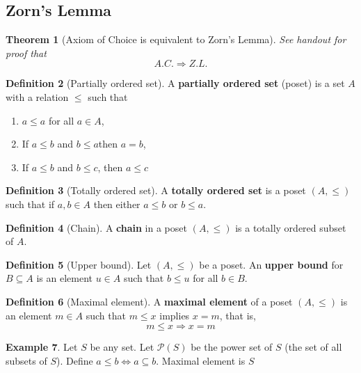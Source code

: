 \documentclass[10pt, oneside, reqno]{amsart}
\theoremstyle{plain}%
\newtheorem{thm}{Theorem}[section]
\theoremstyle{definition}
\newtheorem{defn}[thm]{Definition}
\newtheorem{exmp}[thm]{Example}
\theoremstyle{remark}
\begin{document}

\subsection{Zorn's Lemma} %
\label{sub:zorn_s_lemma}

\begin{thm}[Axiom of Choice is equivalent to Zorn's Lemma]
    See handout for proof that \[
        A.C. \Rightarrow Z.L.
    \]
\end{thm}

\begin{defn}[Partially ordered set]
    A \textbf{partially ordered set} (poset) is a set $A$ with a relation $\leq$ such that 
    \begin{enumerate}[(1)]
        \item $ a \leq a$ for all $a \in A$,
        \item If $a \leq b$ and $b \leq a$then $a = b$,
        \item If $a \leq b$ and $b \leq c$, then $a \leq c$
    \end{enumerate}
\end{defn}

\begin{defn}[Totally ordered set]
    A \textbf{totally ordered set} is a poset $(A, \leq)$ such that if $a, b \in A$ then either $a \leq b$ or $b \leq a$.
\end{defn}

\begin{defn}[Chain]
    A \textbf{chain} in a poset $(A, \leq)$ is a totally ordered subset of $A$.
\end{defn}

\begin{defn}[Upper bound]
    Let $(A, \leq)$ be a poset.  An \textbf{upper bound} for $B \subseteq A$ is an element $u \in A$ such that $b \leq u$ for all $ b \in B$.  
\end{defn}

\begin{defn}[Maximal element]
    A \textbf{maximal element} of a poset $(A, \leq)$ is an element $m \in A$ such that $m \leq x$ implies $x = m$, that is, \[
        m \leq x \Rightarrow x = m
    \]
\end{defn}

\begin{exmp}
    Let $S$ be any set.  Let $\mathcal{P}(S)$ be the power set of $S$ (the set of all subsets of $S$).  Define $a \leq b \iff a \subseteq b$.  Maximal element is $S$
\end{exmp}
\end{document}
